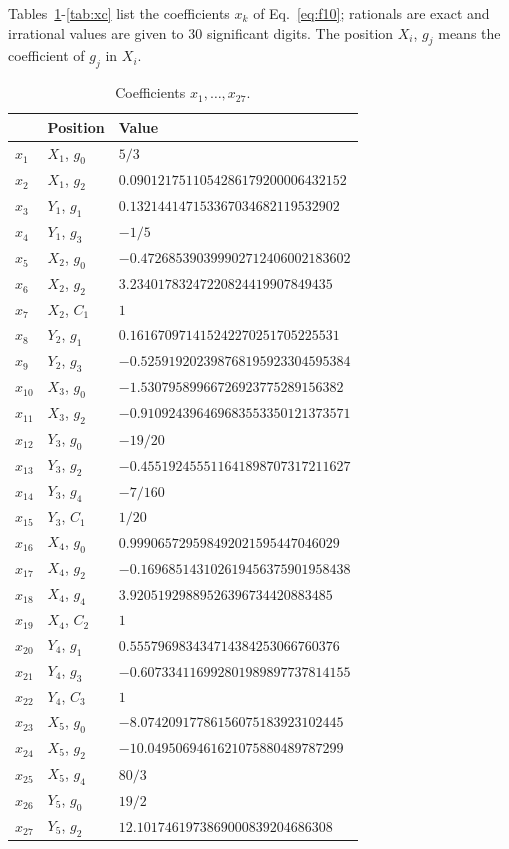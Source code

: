 \documentclass[12pt]{article}
\begin{document}
\noindent Tables~\ref{tab:xa}-\ref{tab:xc} list the coefficients $x_k$ of Eq.~\ref{eq:f10}; rationals are exact and irrational values are given to 30 significant digits. The position $X_i$, $g_j$ means the coefficient of $g_j$ in $X_i$.

\begin{table}[H]
\centering\small
\caption{Coefficients $x_1,\ldots,x_{27}$.}\label{tab:xa}
\begin{tabular}{lll}
\hline
 & Position & Value \\ \hline
$x_{1}$ & $X_{1}$, $g_{0}$ & $5/3$ \\
$x_{2}$ & $X_{1}$, $g_{2}$ & $0.0901217511054286179200006432152$ \\
$x_{3}$ & $Y_{1}$, $g_{1}$ & $0.132144147153367034682119532902$ \\
$x_{4}$ & $Y_{1}$, $g_{3}$ & $-1/5$ \\
$x_{5}$ & $X_{2}$, $g_{0}$ & $-0.472685390399902712406002183602$ \\
$x_{6}$ & $X_{2}$, $g_{2}$ & $3.23401783247220824419907849435$ \\
$x_{7}$ & $X_{2}$, $C_{1}$ & $1$ \\
$x_{8}$ & $Y_{2}$, $g_{1}$ & $0.161670971415242270251705225531$ \\
$x_{9}$ & $Y_{2}$, $g_{3}$ & $-0.525919202398768195923304595384$ \\
$x_{10}$ & $X_{3}$, $g_{0}$ & $-1.53079589966726923775289156382$ \\
$x_{11}$ & $X_{3}$, $g_{2}$ & $-0.910924396469683553350121373571$ \\
$x_{12}$ & $Y_{3}$, $g_{0}$ & $-19/20$ \\
$x_{13}$ & $Y_{3}$, $g_{2}$ & $-0.455192455511641898707317211627$ \\
$x_{14}$ & $Y_{3}$, $g_{4}$ & $-7/160$ \\
$x_{15}$ & $Y_{3}$, $C_{1}$ & $1/20$ \\
$x_{16}$ & $X_{4}$, $g_{0}$ & $0.999065729598492021595447046029$ \\
$x_{17}$ & $X_{4}$, $g_{2}$ & $-0.169685143102619456375901958438$ \\
$x_{18}$ & $X_{4}$, $g_{4}$ & $3.92051929889526396734420883485$ \\
$x_{19}$ & $X_{4}$, $C_{2}$ & $1$ \\
$x_{20}$ & $Y_{4}$, $g_{1}$ & $0.555796983434714384253066760376$ \\
$x_{21}$ & $Y_{4}$, $g_{3}$ & $-0.607334116992801989897737814155$ \\
$x_{22}$ & $Y_{4}$, $C_{3}$ & $1$ \\
$x_{23}$ & $X_{5}$, $g_{0}$ & $-8.07420917786156075183923102445$ \\
$x_{24}$ & $X_{5}$, $g_{2}$ & $-10.0495069461621075880489787299$ \\
$x_{25}$ & $X_{5}$, $g_{4}$ & $80/3$ \\
$x_{26}$ & $Y_{5}$, $g_{0}$ & $19/2$ \\
$x_{27}$ & $Y_{5}$, $g_{2}$ & $12.1017461973869000839204686308$ \\ \hline
\end{tabular}
\end{table}
\end{document}
